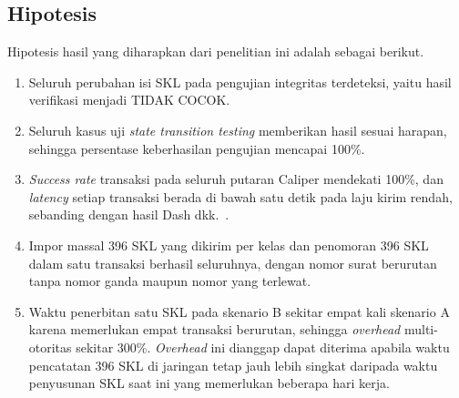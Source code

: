 \subsection{Hipotesis}
Hipotesis hasil yang diharapkan dari penelitian ini adalah sebagai berikut.
\begin{enumerate}
    \item Seluruh perubahan isi SKL pada pengujian integritas terdeteksi, yaitu hasil verifikasi menjadi TIDAK COCOK.
    \item Seluruh kasus uji \textit{state transition testing} memberikan hasil sesuai harapan, sehingga persentase keberhasilan pengujian mencapai 100\%.
    \item \textit{Success rate} transaksi pada seluruh putaran Caliper mendekati 100\%, dan \textit{latency} setiap transaksi berada di bawah satu detik pada laju kirim rendah, sebanding dengan hasil Dash dkk.~\cite{Dash2025Hyperledger}.
    \item Impor massal 396 SKL yang dikirim per kelas dan penomoran 396 SKL dalam satu transaksi berhasil seluruhnya, dengan nomor surat berurutan tanpa nomor ganda maupun nomor yang terlewat.
    \item Waktu penerbitan satu SKL pada skenario B sekitar empat kali skenario A karena memerlukan empat transaksi berurutan, sehingga \textit{overhead} multi-otoritas sekitar 300\%. \textit{Overhead} ini dianggap dapat diterima apabila waktu pencatatan 396 SKL di jaringan tetap jauh lebih singkat daripada waktu penyusunan SKL saat ini yang memerlukan beberapa hari kerja.
\end{enumerate}